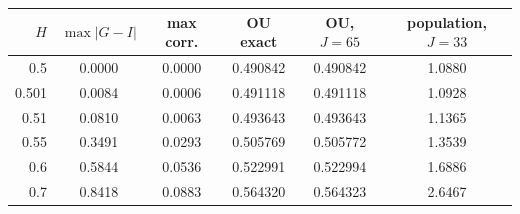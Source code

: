 \begin{tabular}{rccccc}\toprule
$H$ & $\max|G-I|$ & max corr. & OU exact & OU, $J=65$ & population, $J=33$ \\\midrule
0.5 & 0.0000 & 0.0000 & 0.490842 & 0.490842 & 1.0880 \\
0.501 & 0.0084 & 0.0006 & 0.491118 & 0.491118 & 1.0928 \\
0.51 & 0.0810 & 0.0063 & 0.493643 & 0.493643 & 1.1365 \\
0.55 & 0.3491 & 0.0293 & 0.505769 & 0.505772 & 1.3539 \\
0.6 & 0.5844 & 0.0536 & 0.522991 & 0.522994 & 1.6886 \\
0.7 & 0.8418 & 0.0883 & 0.564320 & 0.564323 & 2.6467 \\
\bottomrule\end{tabular}